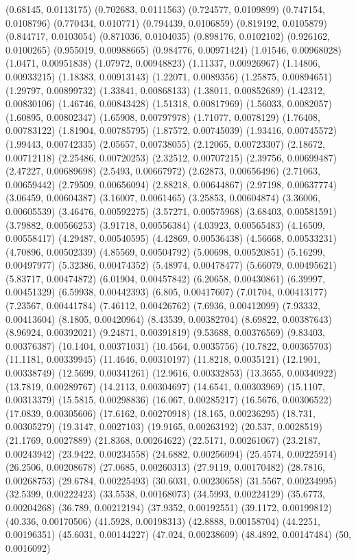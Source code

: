 {(0.68145, 0.0113175)
(0.702683, 0.0111563)
(0.724577, 0.0109899)
(0.747154, 0.0108796)
(0.770434, 0.010771)
(0.794439, 0.0106859)
(0.819192, 0.0105879)
(0.844717, 0.0103054)
(0.871036, 0.0104035)
(0.898176, 0.0102102)
(0.926162, 0.0100265)
(0.955019, 0.00988665)
(0.984776, 0.00971424)
(1.01546, 0.00968028)
(1.0471, 0.00951838)
(1.07972, 0.00948823)
(1.11337, 0.00926967)
(1.14806, 0.00933215)
(1.18383, 0.00913143)
(1.22071, 0.0089356)
(1.25875, 0.00894651)
(1.29797, 0.00899732)
(1.33841, 0.00868133)
(1.38011, 0.00852689)
(1.42312, 0.00830106)
(1.46746, 0.00843428)
(1.51318, 0.00817969)
(1.56033, 0.0082057)
(1.60895, 0.00802347)
(1.65908, 0.00797978)
(1.71077, 0.0078129)
(1.76408, 0.00783122)
(1.81904, 0.00785795)
(1.87572, 0.00745039)
(1.93416, 0.00745572)
(1.99443, 0.00742335)
(2.05657, 0.00738055)
(2.12065, 0.00723307)
(2.18672, 0.00712118)
(2.25486, 0.00720253)
(2.32512, 0.00707215)
(2.39756, 0.00699487)
(2.47227, 0.00689698)
(2.5493, 0.00667972)
(2.62873, 0.00656496)
(2.71063, 0.00659442)
(2.79509, 0.00656094)
(2.88218, 0.00644867)
(2.97198, 0.00637774)
(3.06459, 0.00604387)
(3.16007, 0.0061465)
(3.25853, 0.00604874)
(3.36006, 0.00605539)
(3.46476, 0.00592275)
(3.57271, 0.00575968)
(3.68403, 0.00581591)
(3.79882, 0.00566253)
(3.91718, 0.00556384)
(4.03923, 0.00565483)
(4.16509, 0.00558417)
(4.29487, 0.00540595)
(4.42869, 0.00536438)
(4.56668, 0.00533231)
(4.70896, 0.00502339)
(4.85569, 0.00504792)
(5.00698, 0.00520851)
(5.16299, 0.00497977)
(5.32386, 0.00474352)
(5.48974, 0.00478477)
(5.66079, 0.00495621)
(5.83717, 0.00474872)
(6.01904, 0.00457842)
(6.20658, 0.00430861)
(6.39997, 0.00451329)
(6.59938, 0.00442393)
(6.805, 0.00417607)
(7.01704, 0.00413177)
(7.23567, 0.00441784)
(7.46112, 0.00426762)
(7.6936, 0.00412099)
(7.93332, 0.00413604)
(8.1805, 0.00420964)
(8.43539, 0.00382704)
(8.69822, 0.00387643)
(8.96924, 0.00392021)
(9.24871, 0.00391819)
(9.53688, 0.00376569)
(9.83403, 0.00376387)
(10.1404, 0.00371031)
(10.4564, 0.0035756)
(10.7822, 0.00365703)
(11.1181, 0.00339945)
(11.4646, 0.00310197)
(11.8218, 0.0035121)
(12.1901, 0.00338749)
(12.5699, 0.00341261)
(12.9616, 0.00332853)
(13.3655, 0.00340922)
(13.7819, 0.00289767)
(14.2113, 0.00304697)
(14.6541, 0.00303969)
(15.1107, 0.00313379)
(15.5815, 0.00298836)
(16.067, 0.00285217)
(16.5676, 0.00306522)
(17.0839, 0.00305606)
(17.6162, 0.00270918)
(18.165, 0.00236295)
(18.731, 0.00305279)
(19.3147, 0.0027103)
(19.9165, 0.00263192)
(20.537, 0.0028519)
(21.1769, 0.0027889)
(21.8368, 0.00264622)
(22.5171, 0.00261067)
(23.2187, 0.00243942)
(23.9422, 0.00234558)
(24.6882, 0.00256094)
(25.4574, 0.00225914)
(26.2506, 0.00208678)
(27.0685, 0.00260313)
(27.9119, 0.00170482)
(28.7816, 0.00268753)
(29.6784, 0.00225493)
(30.6031, 0.00230658)
(31.5567, 0.00234995)
(32.5399, 0.00222423)
(33.5538, 0.00168073)
(34.5993, 0.00224129)
(35.6773, 0.00204268)
(36.789, 0.00212194)
(37.9352, 0.00192551)
(39.1172, 0.00199812)
(40.336, 0.00170506)
(41.5928, 0.00198313)
(42.8888, 0.00158704)
(44.2251, 0.00196351)
(45.6031, 0.00144227)
(47.024, 0.00238609)
(48.4892, 0.00147484)
(50, 0.0016092)
}

